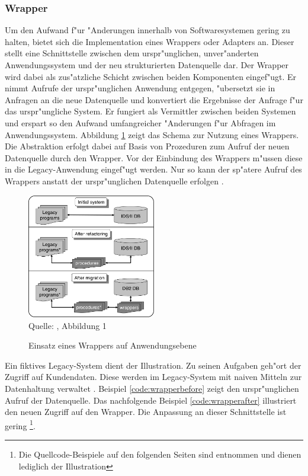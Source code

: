 \subsubsection{Wrapper}

Um den Aufwand f"ur "Anderungen innerhalb von Softwaresystemen gering zu halten, bietet sich die Implementation eines Wrappers oder Adapters an. Dieser stellt eine Schnittstelle zwischen dem urspr"unglichen, unver"anderten Anwendungssystem und der neu strukturierten Datenquelle dar. Der Wrapper wird dabei als zus"atzliche Schicht zwischen beiden Komponenten eingef"ugt. Er nimmt Aufrufe der urspr"unglichen Anwendung entgegen, "ubersetzt sie in Anfragen an die neue Datenquelle und konvertiert die Ergebnisse der Anfrage f"ur das urspr"ungliche System. Er fungiert als Vermittler zwischen beiden Systemen und erspart so den Aufwand umfangreicher "Anderungen f"ur Abfragen im Anwendungssystem.
\lb
Abbildung \ref{pic:application_wrapper} zeigt das Schema zur Nutzung eines Wrappers. Die Abstraktion erfolgt dabei auf Basis von Prozeduren zum Aufruf der neuen Datenquelle durch den Wrapper. Vor der Einbindung des Wrappers m"ussen diese in die Legacy-Anwendung eingef"ugt werden. Nur so kann der sp"atere Aufruf des Wrappers anstatt der urspr"unglichen Datenquelle erfolgen \cite{henrard-2008}. 

\begin{figure}[h!]
	\centering
	\caption{Einsatz eines Wrappers auf Anwendungsebene}
	\label{pic:application_wrapper}
	\includegraphics[width=0.5\textwidth]{../images/large_scale_fig_01.png} \\
	\tiny Quelle: \citep{henrard-2008}, Abbildung 1
\end{figure}

Ein fiktives Legacy-System dient der Illustration. Zu seinen Aufgaben geh"ort der Zugriff auf Kundendaten. Diese werden im Legacy-System mit naiven Mitteln zur Datenhaltung verwaltet \citep{henrard-2002}. Beispiel \ref{code:wrapperbefore} zeigt den urspr"unglichen Aufruf der Datenquelle. Das nachfolgende Beispiel \ref{code:wrapperafter} illustriert den neuen Zugriff auf den Wrapper. Die Anpassung an dieser Schnittstelle ist gering \citep{henrard-2002}\footnote{Die Quellcode-Beispiele auf den folgenden Seiten sind \citep{henrard-2002} entnommen und dienen lediglich der Illustration}.


